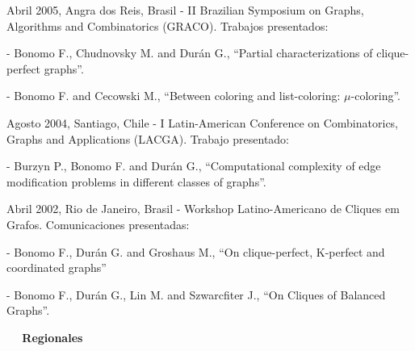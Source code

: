 \begin{compactitem}
\item Abril 2005, Angra dos Reis, Brasil - II Brazilian Symposium
on Graphs, Algorithms and Combinatorics (GRACO). Trabajos
presentados:
\begin{compactitem}
\item[-] Bonomo F., Chudnovsky M. and Dur\'an G., ``Partial
characterizations of clique-perfect graphs''. \item[-] Bonomo F.
and Cecowski M., ``Between coloring and list-coloring:
$\mu$-coloring''.
\end{compactitem}

\smallskip

\item Agosto 2004, Santiago, Chile - I Latin-American Conference
on Combinatorics, Graphs and Applications (LACGA). Trabajo
presentado:
\begin{compactitem}
\item[-] Burzyn P., Bonomo F. and Dur\'an G., ``Computational
complexity of edge modification problems in different classes of
graphs''.
\end{compactitem}

\smallskip

\item Abril 2002, Rio de Janeiro, Brasil - Workshop
Latino-Americano de Cliques em Grafos. Comunicaciones presentadas:
\begin{compactitem}
\item[-] Bonomo F., Dur\'an G. and Groshaus M., ``On
clique-perfect, K-perfect and coordinated graphs'' \item[-] Bonomo
F., Dur\'an G., Lin M. and Szwarcfiter J., ``On Cliques of
Balanced Graphs''.
\end{compactitem}

\end{compactitem}

\bigskip

\textbf{$\quad$ Regionales}

\smallskip

